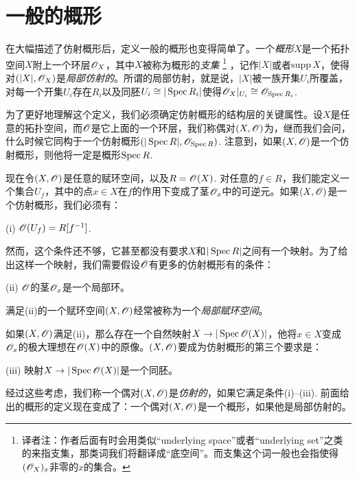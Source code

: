 \section{一般的概形} \label{s:1.2}

在大幅描述了仿射概形后，定义一般的概形也变得简单了。一个\textit{概形}$X$是一个拓扑空间$X$附上一个环层$\mathscr{O}_X$，其中$X$被称为概形的\textit{支集}
\footnote{译者注：作者后面有时会用类似``underlying space''或者``underlying set''之类的来指支集，那类词我们将翻译成“底空间”。而支集这个词一般也会指使得$(\mathscr{O}_X)_x$非零的$x$的集合。}
，记作$|X|$或者$\mathrm{supp}\,X$，使得对$(|X|,\mathscr{O}_X)$是\textit{局部仿射的}。所谓的局部仿射，就是说，$|X|$被一族开集$U_i$所覆盖，对每一个开集$U_i$存在$R_i$以及同胚$U_i\cong |\operatorname{Spec} R_i|$使得$\mathscr{O}_X|_{U_i}\cong \mathscr{O}_{\operatorname{Spec} R_i}$.

为了更好地理解这个定义，我们必须确定仿射概形的结构层的关键属性。设$X$是任意的拓扑空间，而$\mathscr{O}$是它上面的一个环层，我们称偶对$(X,\mathscr{O})$为，继而我们会问，什么时候它同构于一个仿射概形$(|\operatorname{Spec} R|,\mathscr{O}_{\operatorname{Spec} R})$. 注意到，如果$(X,\mathscr{O})$是一个仿射概形，则他将一定是概形$\operatorname{Spec} R$.

现在令$(X,\mathscr{O})$是任意的赋环空间，以及$R=\mathscr{O}(X)$. 对任意的$f\in R$，我们能定义一个集合$U_f$，其中的点$x\in X$在$f$的作用下变成了茎$\mathscr{O}_x$中的可逆元。如果$(X,\mathscr{O})$是一个仿射概形，我们必须有：
\begin{compactitem}
\item[(i)] $\mathscr{O}(U_f)=R[f^{-1}]$.
\end{compactitem}
然而，这个条件还不够，它甚至都没有要求$X$和$|\operatorname{Spec} R|$之间有一个映射。为了给出这样一个映射，我们需要假设$\mathscr{O}$有更多的仿射概形有的条件：
\begin{compactitem}
\item[(ii)] $\mathscr{O}$的茎$\mathscr{O}_x$是一个局部环。
\end{compactitem}
满足(ii)的一个赋环空间$(X,\mathscr{O})$经常被称为一个\textit{局部赋环空间}。

如果$(X,\mathscr{O})$满足(ii)，那么存在一个自然映射$X\to |\operatorname{Spec} \mathscr{O}(X)|$，他将$x\in X$变成$\mathscr{O}_x$的极大理想在$\mathscr{O}(X)$中的原像。$(X,\mathscr{O})$要成为仿射概形的第三个要求是：
\begin{compactitem}
\item[(iii)] 映射$X\to |\operatorname{Spec} \mathscr{O}(X)|$是一个同胚。
\end{compactitem}

经过这些考虑，我们称一个偶对$(X,\mathscr{O})$是\textit{仿射的}，如果它满足条件(i)--(iii). 前面给出的概形的定义现在变成了：一个偶对$(X,\mathscr{O})$是一个概形，如果他是局部仿射的。


